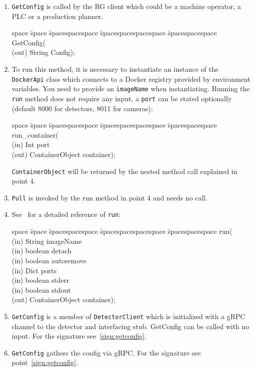 \begin{enumerate}
    \item \texttt{GetConfig} is called by the RG client which could be a machine operator, a PLC or a production planner. \begin{tabbing}
            space \= space \= spacespacespace \= spacespacespacespace \= spacespacespace \kill
            \>  GetConfig(\\
            \>  \>  (out)	 \> 	String           \> Config); 
        \end{tabbing} \label{sign:getconfig}
        
    \item To run this method, it is necessary to instantiate an instance of the \texttt{DockerApi} class which connects to a Docker registry provided by environment variables. You need to provide an \texttt{imageName} when instantiating. Running the \texttt{run} method does not require any input, a \texttt{port} can be stated optionally (default 8000 for detectors, 8011 for cameras): \begin{tabbing}
    space \= space \= spacespacespace \= spacespacespacespace \= spacespacespace \kill
    \>  run\_container(\\
    \>  \>  (in)	 \> 	Int          \> port\\
    \>  \>  (out)	 \> 	ContainerObject           \> container); 
    \end{tabbing}
    \texttt{ContainerObject} will be returned by the nested method call explained in point 4. \label{sign:runcontainer}
    \item \texttt{Pull} is invoked by the run method in point 4 and needs no call. \label{sign:pull}
    \item See~\cite{Docker-Py-Documentation2019Docker2019} for a detailed reference of \texttt{run}: 
    \begin{tabbing}
    space \= space \= spacespacespace \= spacespacespacespace \= spacespacespace \kill
    \>  run(\\
    \>  \>  (in)	 \> 	String          \> imageName\\
    \>  \>  (in)	 \> 	boolean          \> detach\\
    \>  \>  (in)	 \> 	boolean    \> autoremove\\
    \>  \>  (in)	 \> 	Dict   \> ports\\
    \>  \>  (in)	 \> 	boolean   \> stderr\\
    \>  \>  (in)	 \> 	boolean          \> stdout\\
    \>  \>  (out)	 \> 	ContainerObject           \> container); 
    \end{tabbing}\label{sign:run}
    \item \texttt{GetConfig} is a member of \texttt{DetectorClient} which is initialized with a gRPC channel to the detector and interfacing stub. GetConfig can be called with no input. For the signature see~\ref{sign:getconfig}.
    \item \texttt{GetConfig} gathers the config via gRPC. For the signature see point~\ref{sign:getconfig}.
\end{enumerate}


